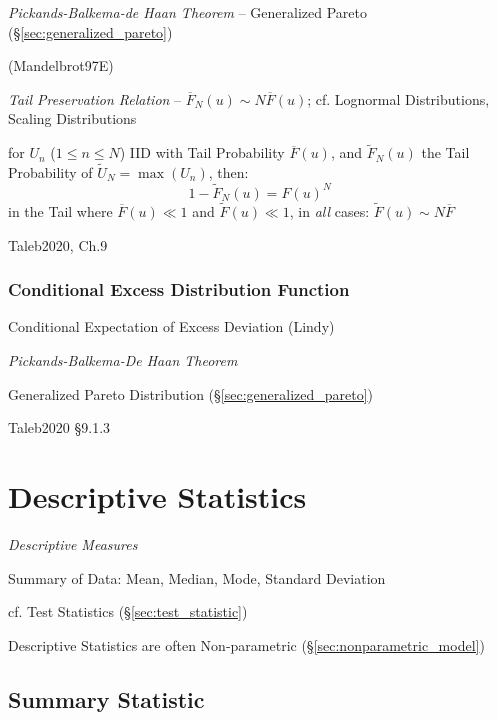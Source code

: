 \emph{Pickands-Balkema-de Haan Theorem} -- Generalized Pareto
(\S\ref{sec:generalized_pareto})

(Mandelbrot97E)

\emph{Tail Preservation Relation} -- $\overline{F}_N(u) \sim N \overline{F}(u)$;
cf. Lognormal Distributions, Scaling Distributions

for $U_n$ ($1 \leq n \leq N$) IID with Tail Probability $\overline{F}(u)$, and
$\tilde{F}_N(u)$ the Tail Probability of $\tilde{U}_N = \max(U_n)$, then:
\[
  1 - \tilde{F}_N(u) = F(u)^N
\]
in the Tail where $\overline{F}(u) \ll 1$ and $\tilde{F}(u) \ll 1$, in
\emph{all} cases: $\tilde{F}(u) \sim N \overline{F}$

Taleb2020, Ch.9



\subsubsection{Conditional Excess Distribution Function}
\label{sec:conditional_excess_distribution}

Conditional Expectation of Excess Deviation (Lindy)

\emph{Pickands-Balkema-De Haan Theorem}

Generalized Pareto Distribution (\S\ref{sec:generalized_pareto})

Taleb2020 \S 9.1.3



\section{Descriptive Statistics}\label{sec:descriptive_statistics}

\emph{Descriptive Measures}

Summary of Data: Mean, Median, Mode, Standard Deviation

cf. Test Statistics (\S\ref{sec:test_statistic})

Descriptive Statistics are often Non-parametric
(\S\ref{sec:nonparametric_model})



\subsection{Summary Statistic}\label{sec:summary_statistic}

